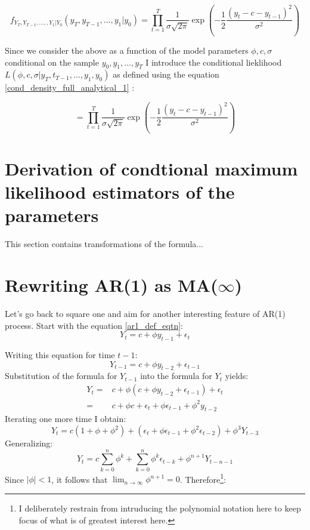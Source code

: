 \documentclass[12pt]{article}
\begin{document}
\begin{equation}
\label{cond_density_full_analytical_1}
f_{Y_T, Y_{T-1}, ..., ,Y_1 | Y_0}(y_T, y_{T-1}, ..., y_1 | y_0) = 
\prod_{t=1}^{T} \frac{1}{\sigma \sqrt{2\pi}} \exp \left(
-\frac{1}{2} \frac{(y_t - c - y_{t-1})^2}{\sigma^2}
\right)
\end{equation}

Since we consider the above as a function of the model parameters 
$\phi, c, \sigma$ conditional on the sample $y_0, y_1, ..., y_T$ I introduce 
the conditional lieklihood $L(\phi, c, \sigma | y_T, t_{T-1}, ..., y_1, y_0)$ as defined 
using the equation \eqref{cond_density_full_analytical_1} :

\begin{equation}
\label{cond_density_full_analytical_2}
 = 
\prod_{t=1}^{T} \frac{1}{\sigma \sqrt{2\pi}} \exp \left(
-\frac{1}{2} \frac{(y_t - c - y_{t-1})^2}{\sigma^2}
\right)
\end{equation}

\section{Derivation of condtional maximum likelihood estimators of the parameters}
This section contains transformations of the formula...

\section{Rewriting AR(1) as MA($\infty$)}
Let's go back to square one and aim for another interesting feature of AR(1) process.
Start with the equation \eqref{ar1_def_eqtn}:
\begin{equation*}
Y_t = c + \phi y_{t-1} + \epsilon_t
\end{equation*}

Writing this equation for time $t-1$:
\begin{equation*}
Y_{t-1} = c + \phi y_{t-2} + \epsilon_{t-1}
\end{equation*}
Substitution of the formula for $Y_{t-1}$ into the formula for $Y_t$ yields:
\begin{eqnarray*}
Y_t = & c + \phi \left(
c + \phi y_{t-2} + \epsilon_{t-1}
\right) + \epsilon_t \\
= & c + \phi c + \epsilon_t + \phi \epsilon_{t-1} + \phi^2 y_{t-2}
\end{eqnarray*}
Iterating one more time I obtain:
\begin{equation*}
Y_t =  c(1 + \phi + \phi^2) +
(\epsilon_t + \phi \epsilon_{t-1} + \phi^2 \epsilon_{t-2}) +
\phi^3 Y_{t-3}
\end{equation*}
Generalizing:
\begin{equation*}
Y_t =  c \sum_{k=0}^{n}\phi^k +
\sum_{k=0}^{n} \phi^k \epsilon_{t-k} +
\phi^{n+1} Y_{t-n-1}
\end{equation*}
Since $|\phi| < 1$, it follows that $\lim_{n \rightarrow \infty} \phi^{n+1} = 0$.
Therefore\footnote{I deliberately restrain from intruducing the polynomial notation here
to keep focus of what is of greatest interest here. }:
\end{document}
